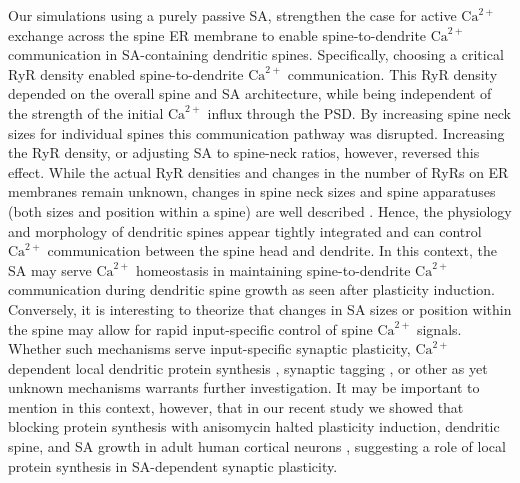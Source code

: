 \documentclass[12pt]{article}
\begin{document}
Our simulations using a purely passive SA, strengthen the case for active $\textrm{Ca}^{2+}$ exchange across the spine ER membrane to enable spine-to-dendrite $\textrm{Ca}^{2+}$ communication in SA-containing dendritic spines. Specifically, choosing a critical RyR density enabled spine-to-dendrite $\textrm{Ca}^{2+}$ communication. This RyR density depended on the overall spine and SA architecture, while being independent of the strength of the initial $\textrm{Ca}^{2+}$ influx through the PSD. By increasing spine neck sizes for individual spines this communication pathway was disrupted. Increasing the RyR density, or adjusting SA to spine-neck ratios, however, reversed this effect.  While the actual RyR densities and changes in the number of RyRs on ER membranes remain unknown, changes in spine neck sizes and spine apparatuses (both sizes and position within a spine) are well described \cite{Vlachos2009,Vlachos2013,Tonnesen2014,PerezAlvarez2020,Yap2020}. Hence, the physiology and morphology of dendritic spines appear tightly integrated and can control $\textrm{Ca}^{2+}$ communication between the spine head and dendrite. In this context, the SA may serve $\textrm{Ca}^{2+}$ homeostasis in maintaining spine-to-dendrite $\textrm{Ca}^{2+}$ communication during dendritic spine growth as seen after plasticity induction. Conversely, it is interesting to theorize that changes in SA sizes or position within the spine may allow for rapid input-specific control of spine $\textrm{Ca}^{2+}$ signals. Whether such mechanisms serve input-specific synaptic plasticity, $\textrm{Ca}^{2+}$ dependent local dendritic protein synthesis \cite{Swanger2013}, synaptic tagging \cite{Martin2002,Park2019}, or other as yet unknown mechanisms warrants further investigation. It may be important to mention in this context, however, that in our recent study we showed that blocking protein synthesis with anisomycin halted plasticity induction, dendritic spine, and SA growth in adult human cortical neurons \cite{Lenz2021}, suggesting a role of local protein synthesis in SA-dependent synaptic plasticity. 
	
\end{document}

